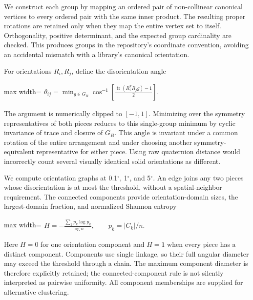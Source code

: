 \documentclass[11pt,a4paper]{article}
\begin{document}
We construct each group by mapping an ordered pair of non-collinear canonical vertices to every ordered pair with the same inner product. The resulting proper rotations are retained only when they map the entire vertex set to itself. Orthogonality, positive determinant, and the expected group cardinality are checked. This produces groups in the repository's coordinate convention, avoiding an accidental mismatch with a library's canonical orientation.

For orientations $R_i,R_j$, define the disorientation angle

\begin{center}\begin{adjustbox}{max width=\linewidth}$\displaystyle\begin{aligned}
\theta_{ij}=\min_{g\in G_B}\cos^{-1}\left[\frac{\operatorname{tr}(R_i^TR_jg)-1}{2}\right].
\end{aligned}$\end{adjustbox}\end{center}

The argument is numerically clipped to $[-1,1]$. Minimizing over the symmetry representatives of both pieces reduces to this single-group minimum by cyclic invariance of trace and closure of $G_B$. This angle is invariant under a common rotation of the entire arrangement and under choosing another symmetry-equivalent representative for either piece. Using raw quaternion distance would incorrectly count several visually identical solid orientations as different.

We compute orientation graphs at 0.1$^{\circ}$, 1$^{\circ}$, and 5$^{\circ}$. An edge joins any two pieces whose disorientation is at most the threshold, without a spatial-neighbor requirement. The connected components provide orientation-domain sizes, the largest-domain fraction, and normalized Shannon entropy

\begin{center}\begin{adjustbox}{max width=\linewidth}$\displaystyle\begin{aligned}
H=-\frac{\sum_k p_k\log p_k}{\log n},\qquad p_k=|C_k|/n.
\end{aligned}$\end{adjustbox}\end{center}

Here $H=0$ for one orientation component and $H=1$ when every piece has a distinct component. Components use single linkage, so their full angular diameter may exceed the threshold through a chain. The maximum component diameter is therefore explicitly retained; the connected-component rule is not silently interpreted as pairwise uniformity. All component memberships are supplied for alternative clustering.
\end{document}
